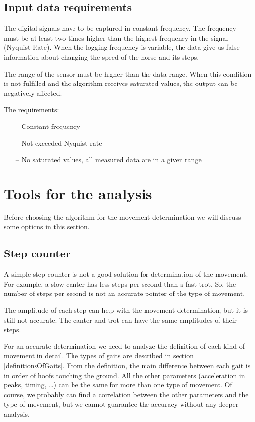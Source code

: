 \subsection{Input data requirements}
The digital signals have to be captured in constant frequency. \cite{DSPbook} The frequency must be at least two times higher than the highest frequency in the signal (Nyquist Rate). \cite{NyquistRate} When the logging frequency is variable, the data give us false information about changing the speed of the horse and its steps.

The range of the sensor must be higher than the data range. When this condition is not fulfilled and the algorithm receives saturated values, the output can be negatively affected.

The requirements:
\begin{itemize}
	\item[--] Constant frequency
	\item[--] Not exceeded Nyquist rate
	\item[--] No saturated values, all measured data are in a given range
\end{itemize}

\section{Tools for the analysis}
Before choosing the algorithm for the movement determination we will discuss some options in this section.

\subsection{Step counter}
\label{stepCounter}
A simple step counter is not a good solution for determination of the movement. For example, a slow canter has less steps per second than a fast trot. So, the number of steps per second is not an accurate pointer of the type of movement.

The amplitude of each step can help with the movement determination, but it is still not accurate. The canter and trot can have the same amplitudes of their steps.

For an accurate determination we need to analyze the definition of each kind of movement in detail. The types of gaits are described in section \ref{definitionsOfGaits}. From the definition, the main difference between each gait is in order of hoofs touching the ground. All the other parameters (acceleration in peaks, timing, \dots) can be the same for more than one type of movement. Of course, we probably can find a correlation between the other parameters and the type of movement, but we cannot guarantee the accuracy without any deeper analysis.

